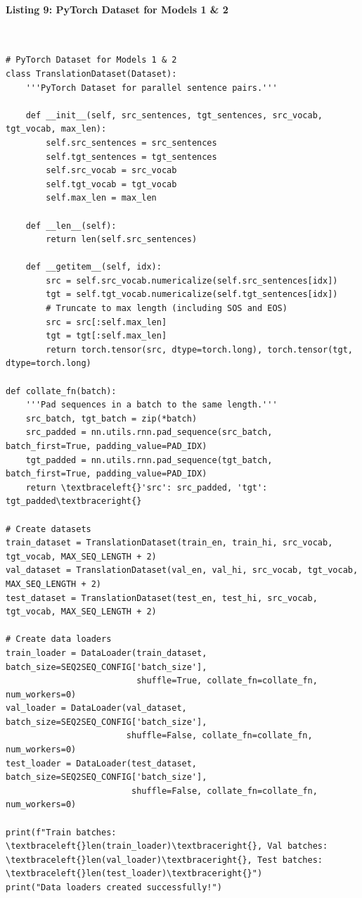 \documentclass[12pt,a4paper,oneside]{report}
\begin{document}
\paragraph{Listing 9: PyTorch Dataset for Models 1 \& 2}\mbox{}\\[-1ex]
\begin{Verbatim}[commandchars=\\\{\},breaklines=true,breakanywhere=true,fontsize=\scriptsize,frame=leftline,framesep=2mm,rulecolor=\color{gray}]
# PyTorch Dataset for Models 1 & 2
class TranslationDataset(Dataset):
    '''PyTorch Dataset for parallel sentence pairs.'''

    def __init__(self, src_sentences, tgt_sentences, src_vocab, tgt_vocab, max_len):
        self.src_sentences = src_sentences
        self.tgt_sentences = tgt_sentences
        self.src_vocab = src_vocab
        self.tgt_vocab = tgt_vocab
        self.max_len = max_len

    def __len__(self):
        return len(self.src_sentences)

    def __getitem__(self, idx):
        src = self.src_vocab.numericalize(self.src_sentences[idx])
        tgt = self.tgt_vocab.numericalize(self.tgt_sentences[idx])
        # Truncate to max length (including SOS and EOS)
        src = src[:self.max_len]
        tgt = tgt[:self.max_len]
        return torch.tensor(src, dtype=torch.long), torch.tensor(tgt, dtype=torch.long)

def collate_fn(batch):
    '''Pad sequences in a batch to the same length.'''
    src_batch, tgt_batch = zip(*batch)
    src_padded = nn.utils.rnn.pad_sequence(src_batch, batch_first=True, padding_value=PAD_IDX)
    tgt_padded = nn.utils.rnn.pad_sequence(tgt_batch, batch_first=True, padding_value=PAD_IDX)
    return \textbraceleft{}'src': src_padded, 'tgt': tgt_padded\textbraceright{}

# Create datasets
train_dataset = TranslationDataset(train_en, train_hi, src_vocab, tgt_vocab, MAX_SEQ_LENGTH + 2)
val_dataset = TranslationDataset(val_en, val_hi, src_vocab, tgt_vocab, MAX_SEQ_LENGTH + 2)
test_dataset = TranslationDataset(test_en, test_hi, src_vocab, tgt_vocab, MAX_SEQ_LENGTH + 2)

# Create data loaders
train_loader = DataLoader(train_dataset, batch_size=SEQ2SEQ_CONFIG['batch_size'],
                          shuffle=True, collate_fn=collate_fn, num_workers=0)
val_loader = DataLoader(val_dataset, batch_size=SEQ2SEQ_CONFIG['batch_size'],
                        shuffle=False, collate_fn=collate_fn, num_workers=0)
test_loader = DataLoader(test_dataset, batch_size=SEQ2SEQ_CONFIG['batch_size'],
                         shuffle=False, collate_fn=collate_fn, num_workers=0)

print(f"Train batches: \textbraceleft{}len(train_loader)\textbraceright{}, Val batches: \textbraceleft{}len(val_loader)\textbraceright{}, Test batches: \textbraceleft{}len(test_loader)\textbraceright{}")
print("Data loaders created successfully!")
\end{Verbatim}
\end{document}
